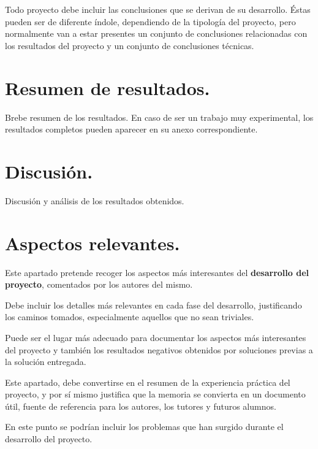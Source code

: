 
Todo proyecto debe incluir las conclusiones que se derivan de su desarrollo. Éstas pueden ser de diferente índole, dependiendo de la tipología del proyecto, pero normalmente van a estar presentes un conjunto de conclusiones relacionadas con los resultados del proyecto y un conjunto de conclusiones técnicas. 

\section{Resumen de resultados.}

Brebe resumen de los resultados. En caso de ser un trabajo muy experimental, los resultados completos pueden aparecer en su anexo correspondiente.

\section{Discusión.}

Discusión y análisis de los resultados obtenidos.


\section{Aspectos relevantes.}

Este apartado pretende recoger los aspectos más interesantes del \textbf{desarrollo del proyecto}, comentados por los autores del mismo.

Debe incluir los detalles más relevantes en cada fase del desarrollo, justificando los caminos tomados, especialmente aquellos que no sean triviales. 

Puede ser el lugar más adecuado para documentar los aspectos más interesantes del proyecto y también los resultados negativos obtenidos por soluciones previas a la solución entregada.

Este apartado, debe convertirse en el resumen de la experiencia práctica del proyecto, y por sí mismo justifica que la memoria se convierta en un documento útil, fuente de referencia para los autores, los tutores y futuros alumnos.

En este punto se podrían incluir los problemas que han surgido durante el desarrollo del proyecto.






